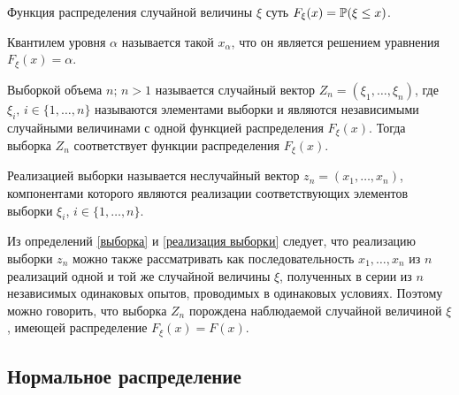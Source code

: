 \documentclass[12pt]{article}
\begin{document}
\begin{definition}
    Функция распределения случайной величины $\xi$ суть $F_\xi(x)=\mathbb{P}(\xi\leq x)$.
\end{definition}
\begin{definition}
    Квантилем уровня $\alpha$ называется такой $x_\alpha$, что он является решением уравнения $F_\xi(x)=\alpha$.
\end{definition}
\begin{definition}\label{выборка}
    Выборкой объема $n;\,n>1$ называется случайный вектор $Z_n=(\xi_1,\ldots,\xi_n)$, где $\xi_i,\,i\in\{1,\ldots,n\}$ называются элементами выборки и являются независимыми случайными величинами с одной функцией распределения $F_\xi(x)$. Тогда выборка $Z_n$ соответствует функции распределения $F_\xi(x)$.
\end{definition}
\begin{definition}\label{реализация выборки}
    Реализацией выборки называется неслучайный вектор $z_n=(x_1,\ldots,x_n)$, компонентами которого являются реализации соответствующих элементов выборки $\xi_i$, $i\in\{1,\ldots,n\}$.
\end{definition}
\begin{consequence}
    Из определений \ref{выборка} и \ref{реализация выборки} следует, что реализацию выборки $z_n$ можно также рассматривать как последовательность $x_1,\ldots,x_n$ из $n$ реализаций одной и той же случайной величины $\xi$, полученных в серии из $n$ независимых одинаковых опытов, проводимых в одинаковых условиях. Поэтому можно говорить, что выборка $Z_n$ порождена наблюдаемой случайной величиной $\xi$, имеющей распределение $F_\xi(x)=F(x)$.
\end{consequence}

\subsection{Нормальное распределение}
\end{document}
